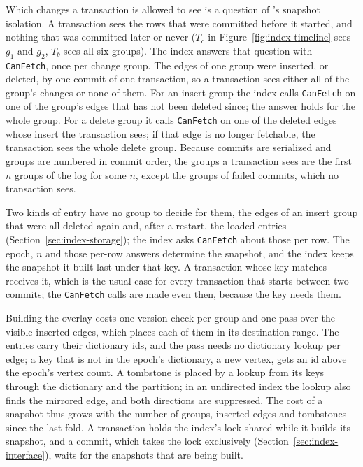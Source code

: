Which changes a transaction is allowed to see is a question of \duckdb's snapshot isolation. A transaction sees the
rows that were committed before it started, and nothing that was committed later or never ($T_c$ in
Figure~\ref{fig:index-timeline} sees $g_1$ and $g_2$, $T_b$ sees all six groups). The index answers that question with \texttt{CanFetch}, once per change group. The edges of one group were inserted, or deleted, by one commit of one transaction, so a transaction sees either
all of the group's changes or none of them. For an insert group the index calls \texttt{CanFetch} on one of the
group's edges that has not been deleted since; the answer holds for the whole group. For a delete group it calls
\texttt{CanFetch} on one of the deleted edges whose insert the transaction sees; if that edge is no longer fetchable,
the transaction sees the whole delete group. Because commits are serialized and groups are numbered in commit order,
the groups a transaction sees are the first $n$ groups of the log for some $n$, except the groups of failed commits,
which no transaction sees.

Two kinds of entry have no group to decide for them, the edges of an insert group that were all deleted again and,
after a restart, the loaded entries (Section~\ref{sec:index-storage}); the index asks \texttt{CanFetch} about those
per row. The epoch, $n$ and those per-row answers determine the snapshot, and the index keeps the snapshot it built
last under that key. A transaction whose key matches receives it, which is the usual case for every transaction that
starts between two commits; the \texttt{CanFetch} calls are made even then, because the key needs them.

Building the overlay costs one version check per group and one pass over the visible inserted edges, which places each
of them in its destination range. The entries carry their dictionary ids, and the pass needs no dictionary lookup per
edge; a key that is not in the epoch's dictionary, a new vertex, gets an id above the epoch's vertex count. A tombstone is placed by a lookup from its keys through the dictionary and the partition; in an undirected index the
lookup also finds the mirrored edge, and both directions are suppressed. The cost of a snapshot thus grows with the
number of groups, inserted edges and tombstones since the last fold. A transaction holds the index's lock shared while it builds its snapshot, and a commit, which takes the lock exclusively (Section~\ref{sec:index-interface}), waits for the snapshots that are being built.

